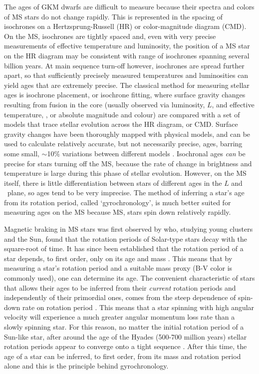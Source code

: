 The ages of GKM dwarfs are difficult to measure because their spectra and
colors of MS stars do not change rapidly.
This is represented in the spacing of isochrones on a Hertzsprung-Russell (HR)
or color-magnitude diagram (CMD).
On the MS, isochrones are tightly spaced and, even with very precise
measurements of effective temperature and luminosity, the position of a MS
star on the HR diagram may be consistent with range of isochrones spanning
several billion years.
At main sequence turn-off however, isochrones are spread further apart, so
that sufficiently precisely measured temperatures and luminosities can yield
ages that are extremely precise.
The classical method for measuring stellar ages is isochrone placement, or
isochrone fitting, where surface gravity changes resulting from fusion in the
core (usually observed via luminosity, $L$, and effective temperature, \teff,
or absolute magnitude and colour) are compared with a set of models that trace
stellar evolution across the HR diagram, or CMD.
Surface gravity changes have been thoroughly mapped with physical models, and
can be used to calculate relatively accurate, but not necessarily precise,
ages, barring some small, $\sim$10\% variations between different models
\citep[\eg][]{yi2001, dotter2008, dotter2016}.
Isochronal ages {\it can} be precise for stars turning off the MS, because the
rate of change in brightness and temperature is large during this phase of
stellar evolution.
However, on the MS itself, there is little differentiation between stars of
different ages in the $L$ and \teff\ plane, so ages tend to be very imprecise.
The method of inferring a star's age from its rotation period, called
`gyrochronology', is much better suited for measuring ages on the MS because
MS, stars spin down relatively rapidly.

Magnetic braking in MS stars was first observed by \citet{skumanich1972} who,
studying young clusters and the Sun, found that the rotation periods of
Solar-type stars decay with the square-root of time.
It has since been established that the rotation period of a star depends, to
first order, only on its age and mass \citep[\eg][]{barnes2003}.
This means that by measuring a star's rotation period and a suitable mass
proxy (B-V color is commonly used), one can determine its age.
The convenient characteristic of stars that allows their ages to be inferred
from their {\it current} rotation periods and independently of their
primordial ones, comes from the steep dependence of spin-down rate on rotation
period \citep{kawaler1989}.
This means that a star spinning with high angular velocity will experience a
much greater angular momentum loss rate than a slowly spinning star.
For this reason, no matter the initial rotation period of a Sun-like star,
after around the age of the Hyades (500-700 million years) stellar rotation
periods appear to converge onto a tight sequence \citep{irwin2009}.
After this time, the age of a star can be inferred, to first order, from its
mass and rotation period alone and this is the principle behind gyrochronology.


